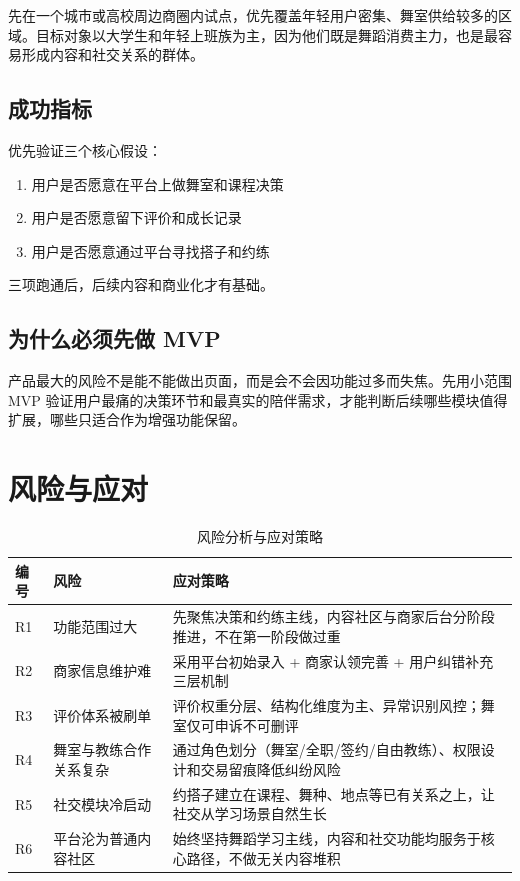 \documentclass[12pt,a4paper]{ctexart}
\begin{document}
先在一个城市或高校周边商圈内试点，优先覆盖年轻用户密集、舞室供给较多的区域。目标对象以大学生和年轻上班族为主，因为他们既是舞蹈消费主力，也是最容易形成内容和社交关系的群体。

\subsection{成功指标}

优先验证三个核心假设：

\begin{enumerate}
    \item 用户是否愿意在平台上做舞室和课程决策
    \item 用户是否愿意留下评价和成长记录
    \item 用户是否愿意通过平台寻找搭子和约练
\end{enumerate}

三项跑通后，后续内容和商业化才有基础。

\subsection{为什么必须先做 MVP}

产品最大的风险不是能不能做出页面，而是会不会因功能过多而失焦。先用小范围 MVP 验证用户最痛的决策环节和最真实的陪伴需求，才能判断后续哪些模块值得扩展，哪些只适合作为增强功能保留。

\section{风险与应对}

\begin{table}[H]
\centering
\caption{风险分析与应对策略}
\begin{tabularx}{\textwidth}{C{0.6cm}L{3cm}X}
\toprule
\textbf{编号} & \textbf{风险} & \textbf{应对策略} \\
\midrule
R1 & 功能范围过大 & 先聚焦决策和约练主线，内容社区与商家后台分阶段推进，不在第一阶段做过重 \\
\midrule
R2 & 商家信息维护难 & 采用平台初始录入 + 商家认领完善 + 用户纠错补充三层机制 \\
\midrule
R3 & 评价体系被刷单 & 评价权重分层、结构化维度为主、异常识别风控；舞室仅可申诉不可删评 \\
\midrule
R4 & 舞室与教练合作关系复杂 & 通过角色划分（舞室/全职/签约/自由教练）、权限设计和交易留痕降低纠纷风险 \\
\midrule
R5 & 社交模块冷启动 & 约搭子建立在课程、舞种、地点等已有关系之上，让社交从学习场景自然生长 \\
\midrule
R6 & 平台沦为普通内容社区 & 始终坚持舞蹈学习主线，内容和社交功能均服务于核心路径，不做无关内容堆积 \\
\bottomrule
\end{tabularx}
\end{table}
\end{document}
